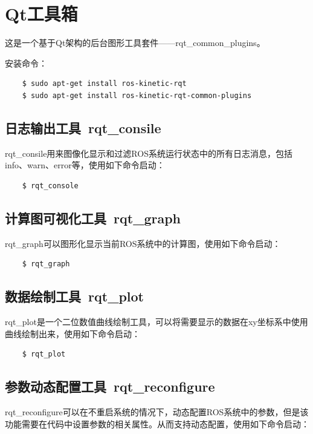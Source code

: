 \documentclass[9pt, oneside]{book}
\begin{document}
\section{Qt工具箱}

这是一个基于Qt架构的后台图形工具套件——rqt\_common\_plugins。

安装命令：

\begin{verbatim}
    $ sudo apt-get install ros-kinetic-rqt
    $ sudo apt-get install ros-kinetic-rqt-common-plugins
\end{verbatim}

\subsection{日志输出工具\ rqt\_consile}

rqt\_consile用来图像化显示和过滤ROS系统运行状态中的所有日志消息，包括info、warn、error等，使用如下命令启动：

\begin{verbatim}
    $ rqt_console
\end{verbatim}

\subsection{计算图可视化工具\ rqt\_graph}

rqt\_graph可以图形化显示当前ROS系统中的计算图，使用如下命令启动：

\begin{verbatim}
    $ rqt_graph
\end{verbatim}

\subsection{数据绘制工具\ rqt\_plot}

rqt\_plot是一个二位数值曲线绘制工具，可以将需要显示的数据在xy坐标系中使用曲线绘制出来，使用如下命令启动：

\begin{verbatim}
    $ rqt_plot
\end{verbatim}

\subsection{参数动态配置工具\ rqt\_reconfigure}

rqt\_reconfigure可以在不重启系统的情况下，动态配置ROS系统中的参数，但是该功能需要在代码中设置参数的相关属性。从而支持动态配置，使用如下命令启动：
\end{document}
